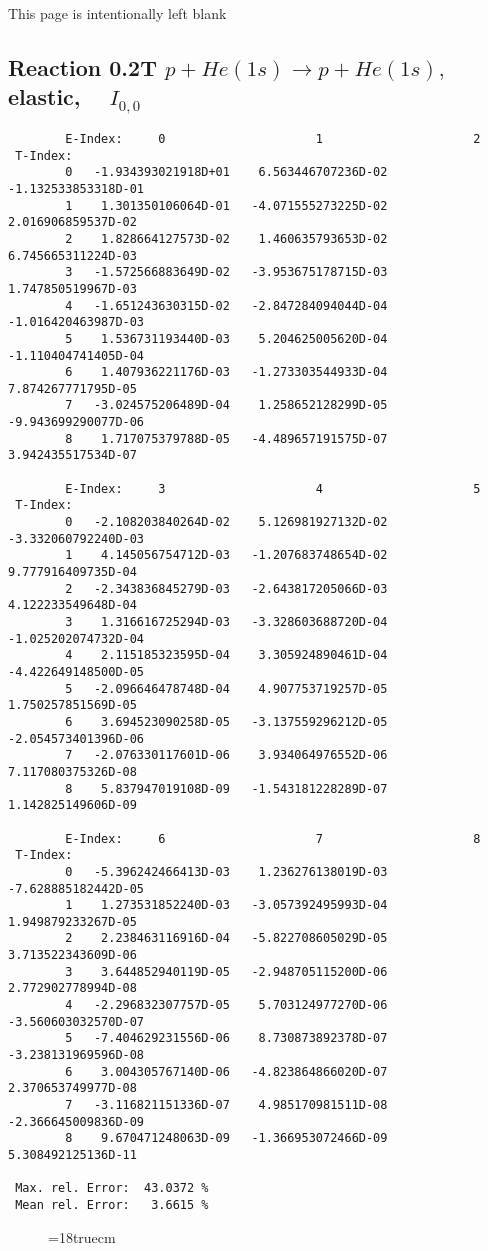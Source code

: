 \newpage
This page is intentionally left blank
\newpage

\subsection{
Reaction 0.2T $ p + He(1s) \rightarrow p + He(1s) ,\quad $
elastic, $ \quad I_{0,0} $
}

\begin{verbatim}
        E-Index:     0                     1                     2
 T-Index:
        0   -1.934393021918D+01    6.563446707236D-02   -1.132533853318D-01
        1    1.301350106064D-01   -4.071555273225D-02    2.016906859537D-02
        2    1.828664127573D-02    1.460635793653D-02    6.745665311224D-03
        3   -1.572566883649D-02   -3.953675178715D-03    1.747850519967D-03
        4   -1.651243630315D-02   -2.847284094044D-04   -1.016420463987D-03
        5    1.536731193440D-03    5.204625005620D-04   -1.110404741405D-04
        6    1.407936221176D-03   -1.273303544933D-04    7.874267771795D-05
        7   -3.024575206489D-04    1.258652128299D-05   -9.943699290077D-06
        8    1.717075379788D-05   -4.489657191575D-07    3.942435517534D-07

        E-Index:     3                     4                     5
 T-Index:
        0   -2.108203840264D-02    5.126981927132D-02   -3.332060792240D-03
        1    4.145056754712D-03   -1.207683748654D-02    9.777916409735D-04
        2   -2.343836845279D-03   -2.643817205066D-03    4.122233549648D-04
        3    1.316616725294D-03   -3.328603688720D-04   -1.025202074732D-04
        4    2.115185323595D-04    3.305924890461D-04   -4.422649148500D-05
        5   -2.096646478748D-04    4.907753719257D-05    1.750257851569D-05
        6    3.694523090258D-05   -3.137559296212D-05   -2.054573401396D-06
        7   -2.076330117601D-06    3.934064976552D-06    7.117080375326D-08
        8    5.837947019108D-09   -1.543181228289D-07    1.142825149606D-09

        E-Index:     6                     7                     8
 T-Index:
        0   -5.396242466413D-03    1.236276138019D-03   -7.628885182442D-05
        1    1.273531852240D-03   -3.057392495993D-04    1.949879233267D-05
        2    2.238463116916D-04   -5.822708605029D-05    3.713522343609D-06
        3    3.644852940119D-05   -2.948705115200D-06    2.772902778994D-08
        4   -2.296832307757D-05    5.703124977270D-06   -3.560603032570D-07
        5   -7.404629231556D-06    8.730873892378D-07   -3.238131969596D-08
        6    3.004305767140D-06   -4.823864866020D-07    2.370653749977D-08
        7   -3.116821151336D-07    4.985170981511D-08   -2.366645009836D-09
        8    9.670471248063D-09   -1.366953072466D-09    5.308492125136D-11

 Max. rel. Error:  43.0372 %
 Mean rel. Error:   3.6615 %

\end{verbatim}
\begin{figure} \label{0.2T}
\epsfxsize=18truecm
\end{figure}
\newpage

